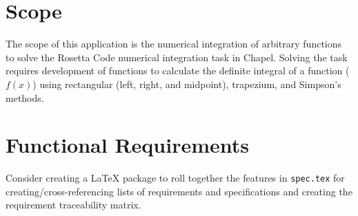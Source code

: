 \label{Requirements}

\section{Scope}
\label{Scope}

The scope of this application is the numerical integration of arbitrary functions 
to solve the Rosetta Code numerical integration task\cite{rosetta-code-numerical-integration}
in Chapel. Solving the task requires development of functions to calculate the definite 
integral of a function ($f(x)$) using rectangular (left, right, and midpoint), trapezium, and Simpson's methods.

\section{Functional Requirements}
\label{Functional_Requirements}

\begin{future}
Consider creating a \LaTeX\xspace package to roll together the features in \lstinline{spec.tex}
for creating/cross-referencing lists of requirements and specifications and creating the 
requirement traceability matrix.
\end{future}

